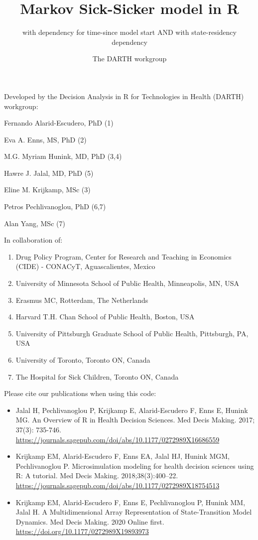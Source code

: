 \documentclass[
]{article}
\title{Markov Sick-Sicker model in R}
\subtitle{with dependency for time-since model start AND with state-residency
dependency}
\author{The DARTH workgroup}
\date{}
\providecommand{\tightlist}{%
  \setlength{\itemsep}{0pt}\setlength{\parskip}{0pt}}
\begin{document}
\maketitle

Developed by the Decision Analysis in R for Technologies in Health
(DARTH) workgroup:

Fernando Alarid-Escudero, PhD (1)

Eva A. Enns, MS, PhD (2)

M.G. Myriam Hunink, MD, PhD (3,4)

Hawre J. Jalal, MD, PhD (5)

Eline M. Krijkamp, MSc (3)

Petros Pechlivanoglou, PhD (6,7)

Alan Yang, MSc (7)

In collaboration of:

\begin{enumerate}
\def\labelenumi{\arabic{enumi}.}
\tightlist
\item
  Drug Policy Program, Center for Research and Teaching in Economics
  (CIDE) - CONACyT, Aguascalientes, Mexico
\item
  University of Minnesota School of Public Health, Minneapolis, MN, USA
\item
  Erasmus MC, Rotterdam, The Netherlands
\item
  Harvard T.H. Chan School of Public Health, Boston, USA
\item
  University of Pittsburgh Graduate School of Public Health, Pittsburgh,
  PA, USA
\item
  University of Toronto, Toronto ON, Canada
\item
  The Hospital for Sick Children, Toronto ON, Canada
\end{enumerate}

Please cite our publications when using this code:

\begin{itemize}
\item
  Jalal H, Pechlivanoglou P, Krijkamp E, Alarid-Escudero F, Enns E,
  Hunink MG. An Overview of R in Health Decision Sciences. Med Decis
  Making. 2017; 37(3): 735-746.
  \url{https://journals.sagepub.com/doi/abs/10.1177/0272989X16686559}
\item
  Krijkamp EM, Alarid-Escudero F, Enns EA, Jalal HJ, Hunink MGM,
  Pechlivanoglou P. Microsimulation modeling for health decision
  sciences using R: A tutorial. Med Decis Making. 2018;38(3):400--22.
  \url{https://journals.sagepub.com/doi/abs/10.1177/0272989X18754513}
\item
  Krijkamp EM, Alarid-Escudero F, Enns E, Pechlivanoglou P, Hunink MM,
  Jalal H. A Multidimensional Array Representation of State-Transition
  Model Dynamics. Med Decis Making. 2020 Online first.
  \url{https://doi.org/10.1177/0272989X19893973}
\end{itemize}
\end{document}
